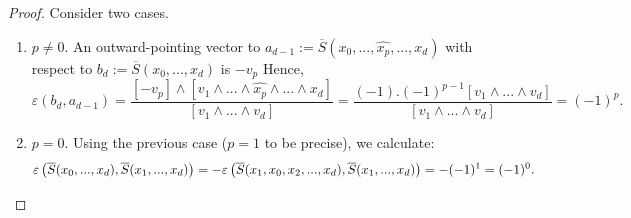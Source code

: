 \documentclass{elsarticle}
\theoremstyle{definition}
\begin{document}
\begin{proof}
  Consider two cases.
  \begin{enumerate}
    \item
      $p \neq 0$. An outward-pointing vector to $a_{d - 1} := \overline{S}(x_{0}, ...,  \widehat{x_{p}}, ..., x_{d})$ with respect to $b_d := \overline{S}(x_{0}, ..., x_{d})$ is $-v_p$ Hence,
      \begin{equation*}
        \varepsilon(b_d, a_{d - 1})
          = \frac{[-v_p] \wedge [v_1 \wedge ... \wedge \widehat{x_p} \wedge ... \wedge x_d]}{[v_1 \wedge ... \wedge v_d]}
          = \frac{(-1).(-1)^{p - 1} [v_1 \wedge ... \wedge v_d]}{[v_1 \wedge ... \wedge v_d]}
          = (-1)^p.
      \end{equation*}
    \item
      $p = 0$. Using the previous case ($p = 1$ to be precise), we calculate:
      \begin{equation*}
        \varepsilon
          \left(
            \overline{S}(x_0, ..., x_d),
            \overline{S}(x_1, ..., x_d)
          \right)
          = 
        - \varepsilon
          \left(
            \overline{S}(x_1, x_0, x_2, ..., x_d),
            \overline{S}(x_1, ..., x_d)
          \right)
          = - (-1)^1
          = (-1)^0. \qedhere
      \end{equation*}
  \end{enumerate}
\end{proof}
\end{document}
